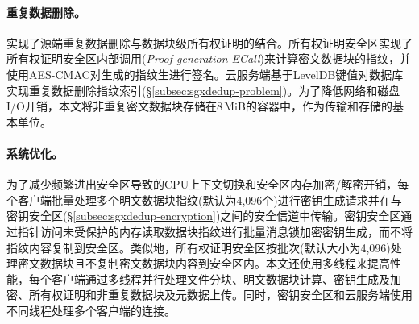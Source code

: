 \paragraph*{重复数据删除。}\sysnameS 实现了源端重复数据删除与数据块级所有权证明的结合。所有权证明安全区实现了所有权证明安全区内部调用(\textit{Proof generation ECall})来计算密文数据块的指纹，并使用AES-CMAC对生成的指纹生进行签名。云服务端基于LevelDB键值对数据库实现重复数据删除指纹索引(\S\ref{subsec:sgxdedup-problem})。为了降低网络和磁盘I/O开销，本文将非重复密文数据块存储在8\,MiB的容器中，作为传输和存储的基本单位。

\paragraph*{系统优化。}为了减少频繁进出安全区导致的CPU上下文切换和安全区内存加密/解密开销，每个客户端批量处理多个明文数据块指纹(默认为4,096个)进行密钥生成请求并在与密钥安全区(\S\ref{subsec:sgxdedup-encryption})之间的安全信道中传输。密钥安全区通过指针访问未受保护的内存读取数据块指纹进行批量消息锁加密密钥生成，而不将指纹内容复制到安全区。类似地，所有权证明安全区按批次(默认大小为4,096)处理密文数据块且不复制密文数据块内容到安全区内。本文还使用多线程来提高性能，每个客户端通过多线程并行处理文件分块、明文数据块计算、密钥生成及加密、所有权证明和非重复数据块及元数据上传。同时，密钥安全区和云服务端使用不同线程处理多个客户端的连接。